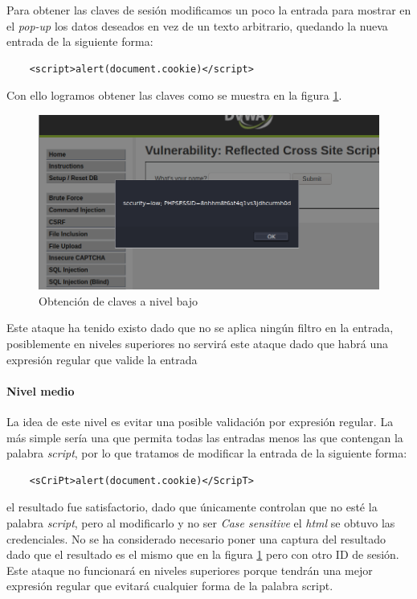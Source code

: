Para obtener las claves de sesión modificamos un poco la entrada para mostrar en el {\it pop-up}
los datos deseados en vez de un texto arbitrario, quedando la nueva entrada de la siguiente forma:
\begin{lstlisting}
    <script>alert(document.cookie)</script>
\end{lstlisting}
Con ello logramos obtener las claves como se muestra en la figura \ref{fig:low}. 
\begin{figure}[ht!]
    \centering
    \includegraphics[width=14cm]{img/xss/low.png}
    \caption{Obtención de claves a nivel bajo}
    \label{fig:low}
\end{figure}
Este ataque ha tenido existo dado que no se aplica ningún filtro  en la entrada,
posiblemente en niveles superiores no servirá este ataque dado que habrá una expresión regular
que valide la entrada

\paragraph{Nivel medio} La idea de este nivel es evitar una posible validación por expresión regular. 
La más simple sería una que permita todas las entradas menos las que contengan la palabra {\it script}, por
lo que tratamos de modificar la entrada de la siguiente forma:
\begin{lstlisting}
    <sCriPt>alert(document.cookie)</ScripT>
\end{lstlisting}
el resultado fue satisfactorio, dado que únicamente controlan que no esté la palabra {\it script}, pero 
al modificarlo y no ser {\it Case sensitive} el {\it html} se obtuvo las credenciales. No se ha considerado necesario 
poner una captura del resultado dado que el resultado es el mismo que en la figura \ref{fig:low} pero con otro
ID de sesión. Este ataque no funcionará en niveles superiores porque tendrán una mejor expresión regular
que evitará cualquier forma de la palabra script.

